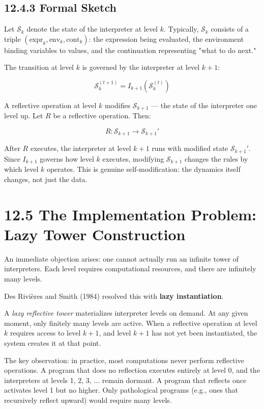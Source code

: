 \subsection{12.4.3 Formal Sketch}

Let $\mathcal{S}_k$ denote the state of the interpreter at level $k$. Typically, $\mathcal{S}_k$ consists of a triple $(\text{expr}_k, \text{env}_k, \text{cont}_k)$: the expression being evaluated, the environment binding variables to values, and the continuation representing "what to do next."

The transition at level $k$ is governed by the interpreter at level $k + 1$:

\[
\mathcal{S}_k^{(t+1)} = I_{k+1}(\mathcal{S}_k^{(t)})
\]

A reflective operation at level $k$ modifies $\mathcal{S}_{k+1}$ --- the state of the interpreter one level up. Let $R$ be a reflective operation. Then:

\[
R: \mathcal{S}_{k+1} \to \mathcal{S}_{k+1}'
\]

After $R$ executes, the interpreter at level $k + 1$ runs with modified state $\mathcal{S}_{k+1}'$. Since $I_{k+1}$ governs how level $k$ executes, modifying $\mathcal{S}_{k+1}$ changes the rules by which level $k$ operates. This is genuine self-modification: the dynamics itself changes, not just the data.

\section{12.5 The Implementation Problem: Lazy Tower Construction}

An immediate objection arises: one cannot actually run an infinite tower of interpreters. Each level requires computational resources, and there are infinitely many levels.

Des Rivières and Smith (1984) resolved this with \textbf{lazy instantiation}.

\begin{definition}
A \textit{lazy reflective tower} materializes interpreter levels on demand. At any given moment, only finitely many levels are active. When a reflective operation at level $k$ requires access to level $k + 1$, and level $k + 1$ has not yet been instantiated, the system creates it at that point.

The key observation: in practice, most computations never perform reflective operations. A program that does no reflection executes entirely at level 0, and the interpreters at levels 1, 2, 3, ... remain dormant. A program that reflects once activates level 1 but no higher. Only pathological programs (e.g., ones that recursively reflect upward) would require many levels.
\end{definition}

